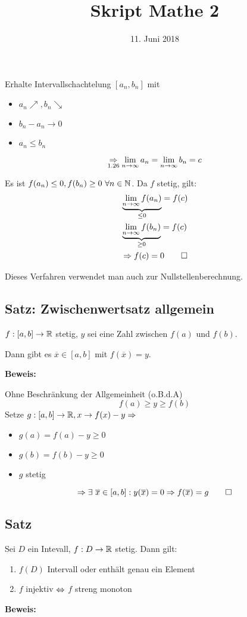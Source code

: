 \documentclass[10pt, a4paper, fleqn]{article}
\begin{document}
    \title{Skript Mathe 2}
    \date{11. Juni 2018}
    \maketitle
\fi

Erhalte Intervallschachtelung $[a_n, b_n]$ mit
\begin{itemize}
    \item $a_n \nearrow, b_n \searrow$
    \item $b_n - a_n \to 0$
    \item $a_n \leq b_n$
\end{itemize}
\[
    \underset{1.26}{\Rightarrow} \lim_{n \to \infty} a_n = \lim_{n \to \infty} b_n = c
\]

Es ist $f(a_n) \leq 0, f(b_n) \geq 0 \ \forall n \in \IN$.
Da $f$ stetig, gilt:
\[\begin{aligned}
    & \underbrace{\lim_{n \to \infty} f(a_n)}_{\leq 0} = f(c) \\
    & \underbrace{\lim_{n \to \infty} f(b_n)}_{\geq 0} = f(c) \\
    & \Rightarrow f(c) = 0 \qed
\end{aligned}\]

Dieses Verfahren verwendet man auch zur Nullstellenberechnung.

\subsection{Satz: Zwischenwertsatz allgemein}
$f: [a, b] \to \mathbb{R}$ stetig, $y$ sei eine Zahl zwischen $f(a)$ und $f(b)$.

Dann gibt es $\overline{x} \in [a, b]$ mit $f(\overline{x}) = y$.

\textbf{Beweis: }

Ohne Beschränkung der Allgemeinheit (o.B.d.A)
\[
    f(a) \geq y \geq f(b)    
\]
Setze $g: [a, b] \to \mathbb{R}, x \to f(x) - y \Rightarrow$
\begin{itemize}
    \item $g(a) = f(a) - y \geq 0$
    \item $g(b) = f(b) - y \geq 0$
    \item $g$ stetig
\end{itemize}
\[
    \Rightarrow \exists \ \overline{x} \in [a, b]: y(\overline{x}) = 0 \Rightarrow f(\overline{x}) = g \qed    
\]

\subsection{Satz}
Sei $D$ ein Intevall, $f: D \to \mathbb{R}$ stetig. Dann gilt:
\begin{enumerate}[1.]
    \item $f(D)$ Intervall oder enthält genau ein Element
    \item $f$ injektiv $\Leftrightarrow$ $f$ streng monoton
\end{enumerate}
\textbf{Beweis: }
\end{document}
